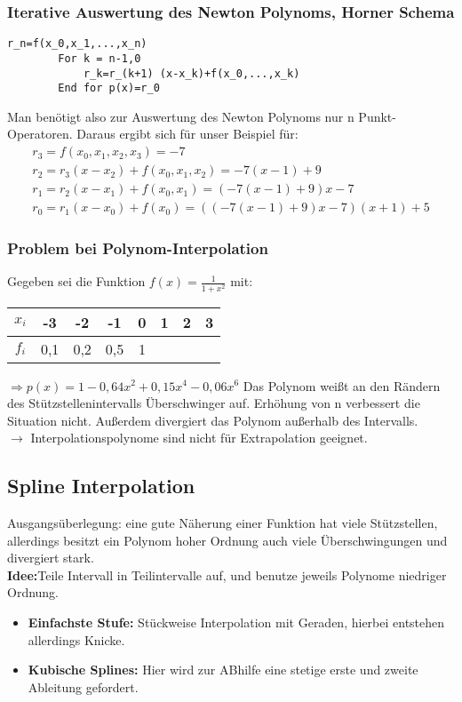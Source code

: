 \documentclass{scrartcl}
\begin{document}
\subsubsection*{Iterative Auswertung des Newton Polynoms, Horner Schema}
\begin{lstlisting}[frame=single]
	r_n=f(x_0,x_1,...,x_n)
        For k = n-1,0
       		r_k=r_(k+1) (x-x_k)+f(x_0,...,x_k)
       	End for p(x)=r_0                      
\end{lstlisting}
Man benötigt also zur Auswertung des Newton Polynoms nur n Punkt-Operatoren.
Daraus ergibt sich für unser Beispiel für:
\begin{align*}
r_3=f(x_0,x_1,x_2,x_3)=-7 \\
r_2=r_3 (x-x_2)+ f(x_0,x_1, x_2)=-7(x-1)+9 \\
r_1=r_2(x-x_1)+f(x_0,x_1)=(-7(x-1)+9)x-7 \\
r_0=r_1(x-x_0)+f(x_0)=((-7(x-1)+9)x-7)(x+1)+5
\end{align*}

\subsubsection*{Problem bei Polynom-Interpolation}
Gegeben sei die Funktion $f(x)=\frac{1}{1+x^2}$ mit: \\
\begin{tabular}{c|ccccccc}
 
$x_i$ & -3 & -2 & -1 & 0 & 1 & 2 & 3 \\ 
\hline 
$f_i$ & 0,1 & 0,2 & 0,5 & 1 &  &  &  \\ 

\end{tabular}
$\Rightarrow p(x)=1-0,64x^2+0,15x^4-0,06x^6$
Das Polynom weißt an den Rändern des Stützstellenintervalls Überschwinger auf.
Erhöhung von n verbessert die Situation nicht.
Außerdem divergiert das Polynom außerhalb des Intervalls. \\
$\rightarrow$ Interpolationspolynome sind nicht für Extrapolation geeignet.

\subsection{Spline Interpolation}
Ausgangsüberlegung: eine gute Näherung einer Funktion hat viele Stützstellen, allerdings besitzt ein Polynom hoher Ordnung auch viele Überschwingungen und divergiert stark.\\
\textbf{Idee:}Teile Intervall in Teilintervalle auf, und benutze jeweils Polynome niedriger Ordnung.\\
\begin{itemize}
\item \textbf{Einfachste Stufe:} Stückweise Interpolation mit Geraden, hierbei entstehen allerdings Knicke.\\
\item \textbf{Kubische Splines:} Hier wird zur ABhilfe eine stetige erste und zweite Ableitung gefordert.
\end{itemize}
\end{document}
